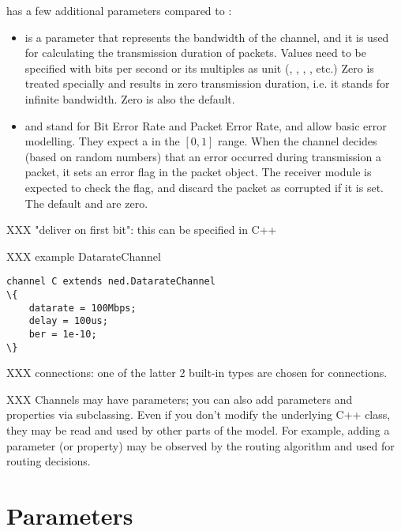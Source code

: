  has a few additional parameters compared to :

\begin{itemize}
    \item {} is a  parameter that represents the
          bandwidth of the channel, and it is used for calculating the
          transmission duration of packets. Values need to be specified
          with bits per second or its multiples as unit (,
          , , , etc.) Zero is treated
          specially and results in zero transmission duration, i.e.
          it stands for infinite bandwidth. Zero is also the default.
    \item {} and  stand for Bit Error Rate and Packet Error Rate,
          and allow basic error modelling. They expect a 
          in the $[0,1]$ range. When the channel decides (based on random
          numbers) that an error occurred during transmission a packet,
          it sets an error flag in the packet object. The receiver
          module is expected to check the flag, and discard the packet
          as corrupted if it is set. The default  and 
          are zero.
\end{itemize}

\begin{note}
    XXX "deliver on first bit": this can be specified in C++
\end{note}

XXX example DatarateChannel

\begin{Verbatim}[commandchars=\\\{\}]
channel C extends ned.DatarateChannel
\{
    datarate = 100Mbps;
    delay = 100us;
    ber = 1e-10;
\}
\end{Verbatim}

XXX connections: one of the latter 2 built-in types are chosen for connections.

XXX Channels may have parameters; you can also add parameters and properties
via subclassing. Even if you don't modify the underlying C++ class,
they may be read and used by other parts of the model. For example,
adding a  parameter (or  property) may be observed
by the routing algorithm and used for routing decisions.


\section{Parameters}

